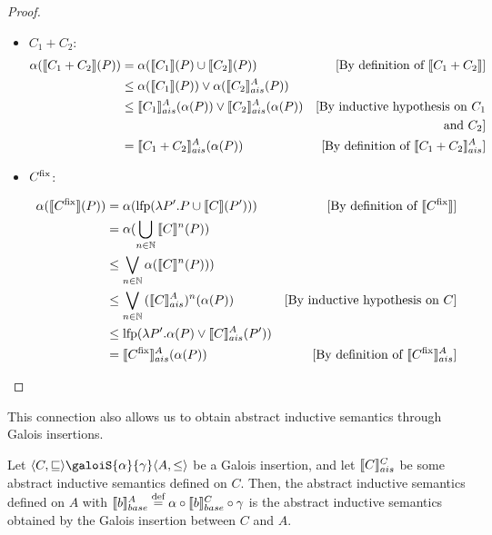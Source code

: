 \documentclass[
  10pt,       %
  twoside,    %
  a4paper,    %
  english,    %
  tikz,       %
  openright,  %
]{book}
\begin{document}
\begin{proof}
\begin{itemize}
    \item $C_1 + C_2$:
      \begin{align*}
        \alpha(\sem{C_1 + C_2}(P))
          &= \alpha(\sem{C_1}(P) \cup \sem{C_2}(P))
          &\text{[By definition of $\sem{C_1 + C_2}$]}\\
          &\leq \alpha(\sem{C_1}(P)) \join \alpha(\asem{C_2}(P)) \\
          &\leq \asem{C_1}(\alpha(P)) \join \asem{C_2}(\alpha(P))
          &\text{[By inductive hypothesis on $C_1$} \\
          && \text{and $C_2$]} \\
          &= \asem{C_1 + C_2}(\alpha(P))
          &\text{[By definition of $\asem{C_1 + C_2}$]}\\
      \end{align*}
    
    \item $C^\fix$:

      \begin{align*}
        \alpha(\sem{C^\fix}(P) )
          &= \alpha(\lfp(\lambda P'. P \cup \sem{C}(P')))
          &\text{[By definition of $\sem{C^\fix}$]}\\
          &= \alpha(\bigcup_{n \in \mathbb{N}}{\sem{C}^n(P)}) \\
          &\leq \bigvee_{n \in \mathbb{N}}{\alpha(\sem{C}^n(P))}) \\
          &\leq \bigvee_{n \in \mathbb{N}}{(\asem{C})^n(\alpha(P))}
          &\text{[By inductive hypothesis on $C$]}\\
          &\leq \lfp(\lambda P'. \alpha(P) \join \asem{C}(P')) \\
          &= \asem{C^\fix}(\alpha(P)) 
          &\text{[By definition of $\asem{C^\fix}$]}\\
      \end{align*}
  \end{itemize}
\end{proof}

This connection also allows us to obtain abstract inductive semantics through 
Galois insertions.

\begin{definition}
  \label{def:aisgi}
  Let $\langle C, \sqsubseteq \rangle \galoiS{\alpha}{\gamma} \langle A, \leq
  \rangle$ be a Galois insertion, and let $\asem[C]{C}$ be some abstract
  inductive semantics defined on $C$. Then, the abstract inductive semantics
  defined on $A$ with $\bsem{b}^A \defeq \alpha \circ \bsem{b}^C \circ \gamma$
  is the abstract inductive semantics obtained by the Galois insertion between
  $C$ and $A$.
\end{definition}
\end{document}
